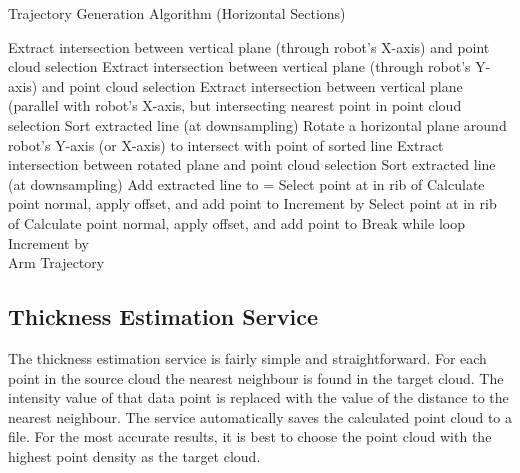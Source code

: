 \begin{spacing}{0.8}
\begin{algorithm}[H]
\caption{Trajectory Generation Algorithm (Horizontal Sections)}
\label{alg:trajh}
\begin{algorithmic}[1]
\begin{raggedright}
\State Extract intersection between vertical plane (through robot's X-axis) and point cloud selection
\State Extract intersection between vertical plane (through robot's Y-axis) and point cloud selection
\EndIf
{}
\State Extract intersection between vertical plane (parallel with robot's X-axis, but intersecting nearest point in point cloud selection
\EndIf 
\State Sort extracted line (at  downsampling)
\State Rotate a horizontal plane around robot's Y-axis (or X-axis) to intersect with point  of sorted line
\State Extract intersection between rotated plane and point cloud selection
\State Sort extracted line (at  downsampling)
\State Add extracted line to 
\EndFor
\State {} = 
\State Select point at  in rib  of 
\State Calculate point normal, apply offset, and add point to 
\EndFor
\State Increment  by 
\State Select point at  in rib  of 
\State Calculate point normal, apply offset, and add point to 
\EndFor
{}
\State Break while loop
\EndIf
\State Increment  by 
\EndWhile
\EndFunction\\
\Return Arm Trajectory
\end{raggedright}
\end{algorithmic}
\end{algorithm}
\end{spacing}
\subsection{Thickness Estimation Service}

The thickness estimation service is fairly simple and straightforward. For each point in the source cloud the nearest neighbour is found in the target cloud. The intensity value of that data point is replaced with the value of the distance to the nearest neighbour. The service automatically saves the calculated point cloud to a file. For the most accurate results, it is best to choose the point cloud with the highest point density as the target cloud.\\

